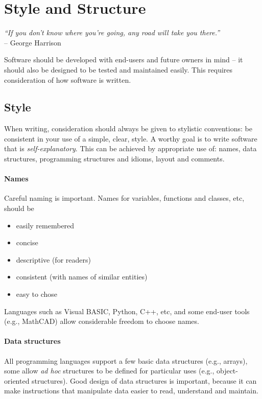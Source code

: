 \section{Style and Structure}
\begin{flushright}
\textit{“If you don’t know where you’re going, any road will take you there.”} \\
-- George Harrison 
\end{flushright}


Software should be developed with end-users and future owners in mind – it should also be designed to be tested and maintained easily. This requires consideration of how software is written.

\subsection{Style}
When writing, consideration should always be given to stylistic conventions: be consistent in your use of a simple, clear, style. A worthy goal is to write software that is \textit{self-explanatory}. This can be achieved by appropriate use of: names, data structures, programming structures and idioms, layout and comments. 

\paragraph{Names}
Careful naming is important. Names for variables, functions and classes, etc, should be
\begin{itemize}
\item easily remembered
\item concise
\item descriptive (for readers)
\item consistent (with names of similar entities)
\item easy to chose 
\end{itemize} 

Languages such as Visual BASIC, Python, C++, etc, and some end-user tools (e.g., MathCAD) allow considerable freedom to choose names. 

\paragraph{Data structures} All programming languages support a few basic data structures (e.g., arrays), some allow \textit{ad hoc} structures to be defined for particular uses (e.g., object-oriented structures). Good design of data structures is important, because it can make instructions that manipulate data easier to read, understand and maintain.

